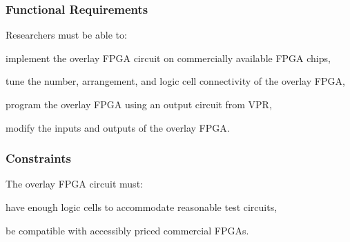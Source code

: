 %


\subsubsection{Functional Requirements}

Researchers must be able to:
\begin{itemlist}
	\item implement the overlay FPGA circuit on commercially available FPGA chips,
	\item tune the number, arrangement, and logic cell connectivity of the overlay FPGA,
	\item program the overlay FPGA using an output circuit from VPR,
	\item modify the inputs and outputs of the overlay FPGA.
\end{itemlist}


\subsubsection{Constraints}

The overlay FPGA circuit must:
\begin{itemlist}
	\item have enough  logic cells to accommodate reasonable test circuits,
	\item be compatible with accessibly priced commercial FPGAs.
\end{itemlist}


